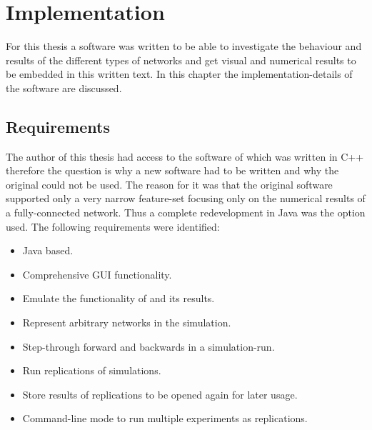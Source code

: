 \documentclass[Bachelorarbeit.tex]{subfiles}
\begin{document}
\graphicspath{{./figures/implementation/}}	%

\chapter{Implementation}
\label{ch:implementation}

For this thesis a software was written to be able to investigate the behaviour and results of the different types of networks and get visual and numerical results to be embedded in this written text. In this chapter the implementation-details of the software are discussed.

\section{Requirements}
The author of this thesis had access to the software of \cite{Breuer2015} which was written in C++ therefore the question is why a new software had to be written and why the original could not be used. The reason for it was that the original software supported only a very narrow feature-set focusing only on the numerical results of a fully-connected network. Thus a complete redevelopment in Java was the option used. The following requirements were identified:

\begin{itemize}
\item Java based.
\item Comprehensive GUI functionality.
\item Emulate the functionality of \cite{Breuer2015} and its results.
\item Represent arbitrary networks in the simulation.
\item Step-through forward and backwards in a simulation-run.
\item Run replications of simulations.
\item Store results of replications to be opened again for later usage.
\item Command-line mode to run multiple experiments as replications.
\end{itemize}
\end{document}
